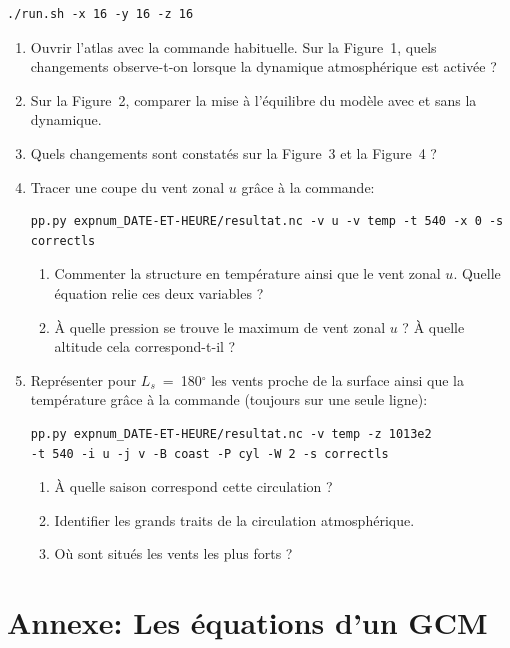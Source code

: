 \documentclass[a4paper,12pt]{article}
\begin{document}
\begin{verbatim}
./run.sh -x 16 -y 16 -z 16
\end{verbatim}

\begin{enumerate}
\item Ouvrir l'atlas avec la commande habituelle. Sur la Figure~1, quels
changements observe-t-on lorsque la dynamique atmosphérique est activée ?
\item Sur la Figure~2, comparer la mise à l'équilibre du modèle avec et sans la
dynamique.
\item Quels changements sont constatés sur la Figure~3 et la Figure~4 ?

\item Tracer une coupe du vent zonal $u$ grâce à la commande:

\begin{verbatim}
pp.py expnum_DATE-ET-HEURE/resultat.nc -v u -v temp -t 540 -x 0 -s correctls
\end{verbatim}

\begin{enumerate}
\item Commenter la structure en température ainsi que le vent zonal $u$. Quelle
équation relie ces deux variables ?
\item \`A quelle pression se trouve le maximum de vent zonal $u$ ? \`A quelle
altitude cela correspond-t-il ?
\end{enumerate}

\item Représenter pour $L_s$~=~180$^\circ$ les vents proche de la surface ainsi
que la température grâce à la commande (toujours sur une seule ligne):

\begin{verbatim}
pp.py expnum_DATE-ET-HEURE/resultat.nc -v temp -z 1013e2
-t 540 -i u -j v -B coast -P cyl -W 2 -s correctls
\end{verbatim}

\begin{enumerate}
\item \`A quelle saison correspond cette circulation ?
\item Identifier les grands traits de la circulation atmosphérique.
\item Où sont situés les vents les plus forts ?
\end{enumerate}

\end{enumerate}

\section*{Annexe: Les équations d'un GCM}
\end{document}
